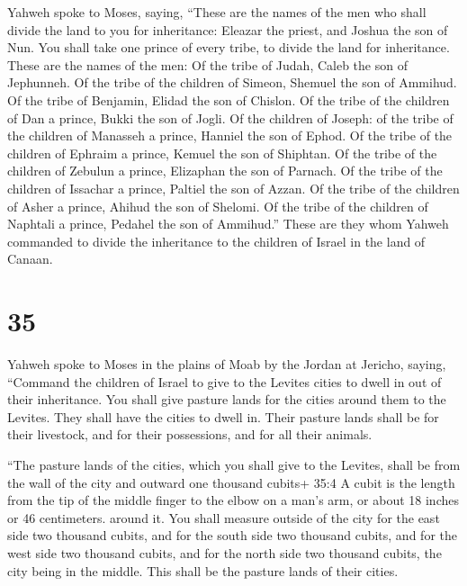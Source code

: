  Yahweh spoke to Moses, saying,  ``These are
the names of the men who shall divide the land to you for inheritance:
Eleazar the priest, and Joshua the son of Nun.  You shall
take one prince of every tribe, to divide the land for inheritance.
 These are the names of the men: Of the tribe of Judah,
Caleb the son of Jephunneh.  Of the tribe of the children
of Simeon, Shemuel the son of Ammihud.  Of the tribe of
Benjamin, Elidad the son of Chislon.  Of the tribe of the
children of Dan a prince, Bukki the son of Jogli.  Of the
children of Joseph: of the tribe of the children of Manasseh a prince,
Hanniel the son of Ephod.  Of the tribe of the children of
Ephraim a prince, Kemuel the son of Shiphtan.  Of the tribe
of the children of Zebulun a prince, Elizaphan the son of Parnach.
 Of the tribe of the children of Issachar a prince, Paltiel
the son of Azzan.  Of the tribe of the children of Asher a
prince, Ahihud the son of Shelomi.  Of the tribe of the
children of Naphtali a prince, Pedahel the son of Ammihud.''
 These are they whom Yahweh commanded to divide the
inheritance to the children of Israel in the land of Canaan.

\hypertarget{section-34}{%
\section{35}\label{section-34}}

 Yahweh spoke to Moses in the plains of Moab by the Jordan
at Jericho, saying,  ``Command the children of Israel to
give to the Levites cities to dwell in out of their inheritance. You
shall give pasture lands for the cities around them to the Levites.
 They shall have the cities to dwell in. Their pasture lands
shall be for their livestock, and for their possessions, and for all
their animals.

 ``The pasture lands of the cities, which you shall give to
the Levites, shall be from the wall of the city and outward one thousand
cubits+ 35:4 A cubit is the length from the tip of the middle finger to
the elbow on a man's arm, or about 18 inches or 46 centimeters. around
it.  You shall measure outside of the city for the east side
two thousand cubits, and for the south side two thousand cubits, and for
the west side two thousand cubits, and for the north side two thousand
cubits, the city being in the middle. This shall be the pasture lands of
their cities.


